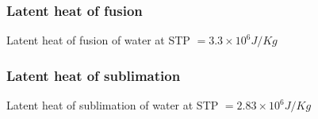\documentclass[fleqn,10pt]{SelfArx} %
\begin{document}
\subsubsection*{Latent heat of fusion}
Latent heat of fusion of water at STP $=3.3 \times 10^6 J/Kg$

\subsubsection*{Latent heat of sublimation}
Latent heat of sublimation of water at STP $=2.83 \times 10^6 J/Kg$

\newpage

%
%
%
%
\end{document}

